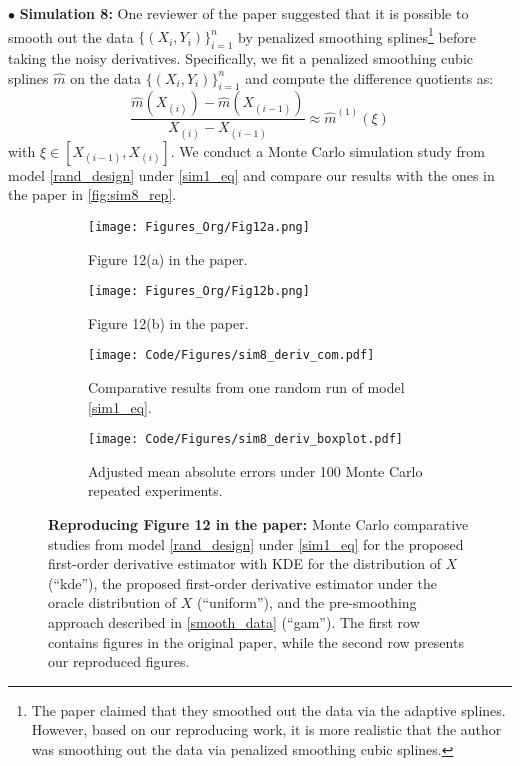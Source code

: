 \documentclass{uwstat572}
\theoremstyle{definition}
\renewcommand{\hat}{\widehat}
\theoremstyle{theorem}
\begin{document}
$\bullet$ {\bf Simulation 8:} One reviewer of the paper suggested that it is possible to smooth out the data $\{(X_i,Y_i)\}_{i=1}^n$ by penalized smoothing splines\footnote{The paper claimed that they smoothed out the data via the adaptive splines. However, based on our reproducing work, it is more realistic that the author was smoothing out the data via penalized smoothing cubic splines.} before taking the noisy derivatives. Specifically, we fit a penalized smoothing cubic splines $\hat{m}$ on the data $\{(X_i,Y_i)\}_{i=1}^n$ and compute the difference quotients as:
\begin{equation}
\label{smooth_data}
\frac{\hat{m}(X_{(i)}) - \hat{m}(X_{(i-1)})}{X_{(i)} - X_{(i-1)}} \approx \hat{m}^{(1)}(\xi)
\end{equation}
with $\xi \in \left[X_{(i-1)}, X_{(i)}\right]$. We conduct a Monte Carlo simulation study from model \eqref{rand_design} under \eqref{sim1_eq} and compare our results with the ones in the paper in \autoref{fig:sim8_rep}.

\begin{figure}[!t]
	\captionsetup[subfigure]{justification=centering}
	\begin{subfigure}[t]{0.49\linewidth}
		\centering
		\texttt{[image: Figures\_Org/Fig12a.png]}
		\caption{Figure 12(a) in the paper.}
	\end{subfigure}
	\hfil
	\begin{subfigure}[t]{0.49\linewidth}
		\centering
		\texttt{[image: Figures\_Org/Fig12b.png]}
		\caption{Figure 12(b) in the paper.}
	\end{subfigure}
	\begin{subfigure}[t]{0.49\linewidth}
		\centering
		\texttt{[image: Code/Figures/sim8\_deriv\_com.pdf]}
		\caption{Comparative results from one random run of model \eqref{sim1_eq}.}
	\end{subfigure}
	\hfil
	\begin{subfigure}[t]{0.49\linewidth}
		\centering
		\texttt{[image: Code/Figures/sim8\_deriv\_boxplot.pdf]}
		\caption{Adjusted mean absolute errors under 100 Monte Carlo repeated experiments.}
	\end{subfigure}
	\caption{{\bf Reproducing Figure 12 in the paper:} Monte Carlo comparative studies from model \eqref{rand_design} under \eqref{sim1_eq} for the proposed first-order derivative estimator with KDE for the distribution of $X$ (``kde''), the proposed first-order derivative estimator under the oracle distribution of $X$ (``uniform''), and the pre-smoothing approach described in \eqref{smooth_data} (``gam''). The first row contains figures in the original paper, while the second row presents our reproduced figures.}
	\label{fig:sim8_rep}
\end{figure}
\end{document}
